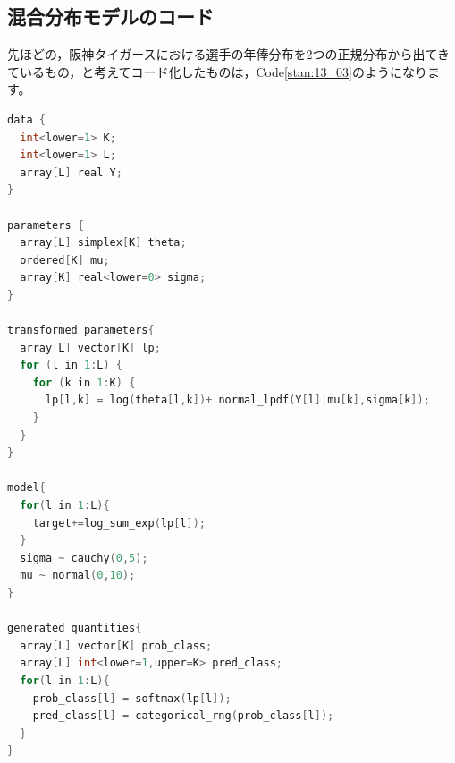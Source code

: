 \documentclass{ltjsbook}
\begin{document}
\subsection{混合分布モデルのコード}
先ほどの，阪神タイガースにおける選手の年俸分布を2つの正規分布から出てきているもの，と考えてコード化したものは，Code\ref{stan:13_03}のようになります。
\begin{lstlisting}[language=C++,label={stan:13_03},caption={混合正規モデル}]
data {
  int<lower=1> K;
  int<lower=1> L;
  array[L] real Y;
}

parameters {
  array[L] simplex[K] theta;
  ordered[K] mu;
  array[K] real<lower=0> sigma;
}

transformed parameters{
  array[L] vector[K] lp;
  for (l in 1:L) {
    for (k in 1:K) {
      lp[l,k] = log(theta[l,k])+ normal_lpdf(Y[l]|mu[k],sigma[k]);
    }
  }
}

model{
  for(l in 1:L){
    target+=log_sum_exp(lp[l]);
  }
  sigma ~ cauchy(0,5);
  mu ~ normal(0,10);
}

generated quantities{
  array[L] vector[K] prob_class;
  array[L] int<lower=1,upper=K> pred_class;
  for(l in 1:L){
    prob_class[l] = softmax(lp[l]);
    pred_class[l] = categorical_rng(prob_class[l]);
  }
}
\end{lstlisting}
\end{document}
